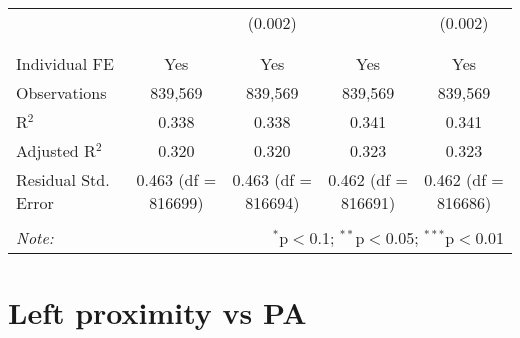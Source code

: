 \documentclass[
]{article}
\begin{document}
\begin{table}[!htbp]
{\begin{tabular}{@{\extracolsep{5pt}}lcccc}
  &  & (0.002) &  & (0.002) \\ 
  & & & & \\ 
\hline \\[-1.8ex] 
Individual FE & Yes & Yes & Yes & Yes \\ 
Observations & 839,569 & 839,569 & 839,569 & 839,569 \\ 
R$^{2}$ & 0.338 & 0.338 & 0.341 & 0.341 \\ 
Adjusted R$^{2}$ & 0.320 & 0.320 & 0.323 & 0.323 \\ 
Residual Std. Error & 0.463 (df = 816699) & 0.463 (df = 816694) & 0.462 (df = 816691) & 0.462 (df = 816686) \\ 
\hline 
\hline \\[-1.8ex] 
\textit{Note:}  & \multicolumn{4}{r}{$^{*}$p$<$0.1; $^{**}$p$<$0.05; $^{***}$p$<$0.01} \\ 
\end{tabular}
} 
\end{table} 
\newpage
\section{Left proximity vs PA}
\end{document}
